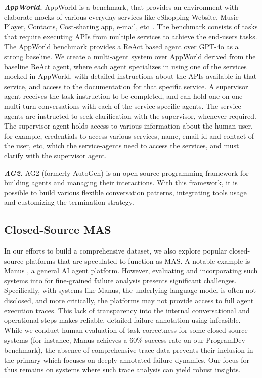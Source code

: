 \textit{\textbf{AppWorld.}}
AppWorld is a benchmark, that provides an environment with elaborate mocks of various everyday services like eShopping Website, Music Player, Contacts, Cost-sharing app, e-mail, etc~\cite{trivedi2024appworld}. The benchmark consists of tasks that require executing APIs from multiple services to achieve the end-users tasks. The AppWorld benchmark provides a ReAct based agent over GPT-4o as a strong baseline. We create a multi-agent system over AppWorld derived from the baseline ReAct agent, where each agent specializes in using one of the services mocked in AppWorld, with detailed instructions about the APIs available in that service, and access to the documentation for that specific service. A supervisor agent receives the task instruction to be completed, and can hold one-on-one multi-turn conversations with each of the service-specific agents. The service-agents are instructed to seek clarification with the supervisor, whenever required. The supervisor agent holds access to various information about the human-user, for example, credentials to access various services, name, email-id and contact of the user, etc, which the service-agents need to access the services, and must clarify with the supervisor agent.

\textit{\textbf{AG2.}} AG2 (formerly AutoGen) \cite{wu2023autogen} is an open-source programming framework for building agents and managing their interactions. 
With this framework, it is possible to build various flexible conversation patterns, integrating tools usage and customizing the termination strategy. 

\subsection{Closed-Source MAS}
In our efforts to build a comprehensive dataset, we also explore popular closed-source platforms that are speculated to function as MAS. A notable example is Manus \cite{manus}, a general AI agent platform. However, evaluating and incorporating such systems into \dataset{} for fine-grained failure analysis presents significant challenges. Specifically, with systems like Manus, the underlying language model is often not disclosed, and more critically, the platforms may not provide access to full agent execution traces. This lack of transparency into the internal conversational and operational steps makes reliable, detailed failure annotation using \taxonomy{} infeasible. While we conduct human evaluation of task correctness for some closed-source systems (for instance, Manus achieves a 60\% success rate on our ProgramDev benchmark), the absence of comprehensive trace data prevents their inclusion in the primary \dataset{} which focuses on deeply annotated failure dynamics. Our focus for \dataset{} thus remains on systems where such trace analysis can yield robust insights.

